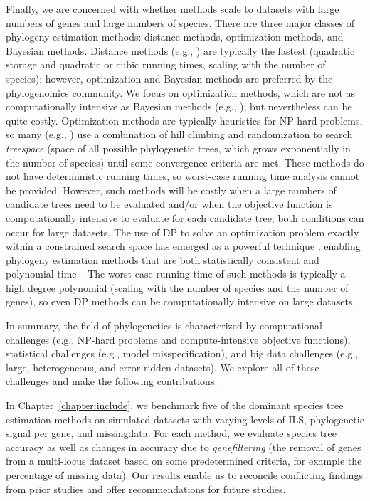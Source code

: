 Finally, we are concerned with whether methods scale to datasets with large numbers of genes and large numbers of species.
There are three major classes of phylogeny estimation methods: distance methods, optimization methods, and Bayesian methods.
Distance methods (e.g., \cite{liu2011estimating-njst, vachaspati2015astrid, dasarathy2015data-metal, allman2019species-logdet}) are typically the fastest (quadratic storage and quadratic or cubic running times, scaling with the number of species); however, optimization and Bayesian methods are preferred by the phylogenomics community.
We focus on optimization methods, which are not as computationally intensive as Bayesian methods (e.g., \cite{heled2010bayesian, ogilvie2017starbeast2}), but nevertheless can be quite costly.
Optimization methods are typically heuristics for NP-hard problems, so many (e.g., \cite{liu2010maximum-mpest, stamatakis2014raxml8, chaudhary2013inferring, chaudhary2014mulrf}) use a combination of hill climbing and randomization to search \textit{\gls{treespace}} (space of all possible phylogenetic trees, which grows exponentially in the number of species) until some convergence criteria are met.
These methods do not have deterministic running times, so worst-case running time analysis cannot be provided.
However, such methods will be costly when a large numbers of candidate trees need to be evaluated and/or when the objective function is computationally intensive to evaluate for each candidate tree; both conditions can occur for large datasets.
The use of \gls{DP} to solve an optimization problem exactly within a constrained search space has emerged as a powerful technique \cite{hallett2000new}, enabling phylogeny estimation methods that are both statistically consistent and polynomial-time~\cite{mirarab2014astral}. 
The worst-case running time of such methods is typically a high degree polynomial (scaling with the number of species and the number of genes), so even DP methods can be computationally intensive on large datasets.

In summary, the field of phylogenetics is characterized by computational challenges (e.g., NP-hard problems and compute-intensive objective functions), statistical challenges (e.g., model misspecification), and big data challenges (e.g., large, heterogeneous, and error-ridden datasets).
We explore all of these challenges and make the following contributions.

In Chapter~\ref{chapter:include}, we benchmark five of the dominant species tree estimation methods on simulated datasets with varying levels of ILS, phylogenetic signal per gene, and \gls{missingdata}.
For each method, we evaluate species tree accuracy as well as changes in accuracy due to \textit{\gls{genefiltering}} (the removal of genes from a multi-locus dataset based on some predetermined criteria, for example the percentage of missing data).
Our results enable us to reconcile conflicting findings from prior studies \cite{chen2015selecting, hosner2016empirical, meiklejohn2016analysis, longo2017phylogenomic, blom2017accounting} and offer recommendations for future studies. 

